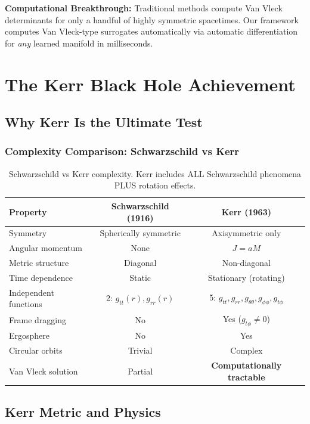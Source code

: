 \documentclass[11pt,a4paper]{article}
\begin{document}
\textbf{Computational Breakthrough:} Traditional methods compute Van Vleck determinants for only a handful of highly symmetric spacetimes. Our framework computes Van Vleck-type surrogates automatically via automatic differentiation for \emph{any} learned manifold in milliseconds.

\section{The Kerr Black Hole Achievement}

\subsection{Why Kerr Is the Ultimate Test}

\subsubsection{Complexity Comparison: Schwarzschild vs Kerr}

\begin{table}[h]
\centering
\begin{tabular}{lcc}
\toprule
\textbf{Property} & \textbf{Schwarzschild (1916)} & \textbf{Kerr (1963)} \\
\midrule
Symmetry & Spherically symmetric & Axisymmetric only \\
Angular momentum & None & $J = aM$ \\
Metric structure & Diagonal & Non-diagonal \\
Time dependence & Static & Stationary (rotating) \\
Independent functions & 2: $g_{tt}(r), g_{rr}(r)$ & 5: $g_{tt}, g_{rr}, g_{\theta\theta}, g_{\phi\phi}, g_{t\phi}$ \\
Frame dragging & No & Yes ($g_{t\phi} \neq 0$) \\
Ergosphere & No & Yes \\
Circular orbits & Trivial & Complex \\
Van Vleck solution & Partial & \textbf{Computationally tractable} \\
\bottomrule
\end{tabular}
\caption{Schwarzschild vs Kerr complexity. Kerr includes ALL Schwarzschild phenomena PLUS rotation effects.}
\end{table}

\subsection{Kerr Metric and Physics}
\end{document}
